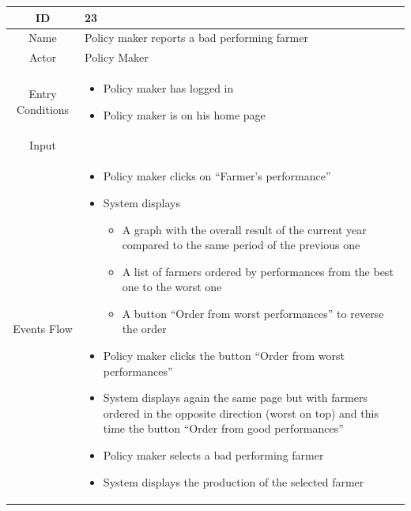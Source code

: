 \documentclass{article}
\begin{document}
\begin{center}
    \begin{longtable}{|c| p{10cm}|}
        \hline
            ID & 23 \\
        \hline
            Name & Policy maker reports a bad performing farmer \\
        \hline
            Actor & Policy Maker \\
        \hline
            Entry Conditions &  \begin{itemize}
                                    \item Policy maker has logged in
                                    \item Policy maker is on his home page
                                \end{itemize}\\
        \hline
            Input &  \\
        \hline
            Events Flow &   \begin{itemize}
                                \item Policy maker clicks on “Farmer’s performance”
                                \item System displays
                                            \begin{itemize}
                                                \item A graph with the overall result of the current year compared to the same period of the previous one
                                                \item A list of farmers ordered by performances from the best one to the worst one 
                                                \item A button “Order from worst performances” to reverse the order
                                            \end{itemize}
                                \item Policy maker clicks the button “Order from worst performances”
                                \item System displays again the same page but with farmers ordered in the opposite direction (worst on top) and this time the button “Order from good performances” 
                                \item Policy maker selects a bad performing farmer
                                \item System displays the production of the selected farmer
                                            \begin{itemize}

\end{itemize}
\end{itemize}
\end{longtable}
\end{center}
\end{document}
